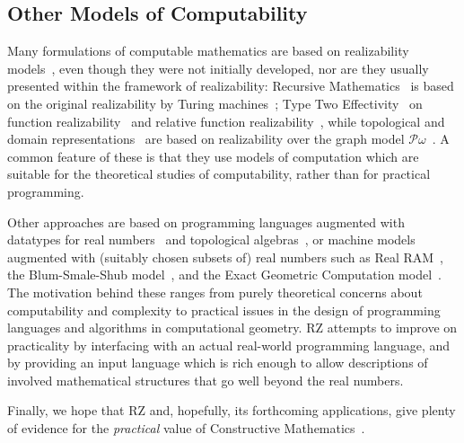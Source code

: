 \subsection{Other Models of Computability}
\label{sec:models-of-computability}

Many formulations of computable mathematics are based on realizability
models~\cite{Bauer:00}, even though they were not initially developed,
nor are they usually presented within the framework of realizability:
Recursive Mathematics~\cite{ershov98:_handb_recur_mathem} is based on
the original realizability by Turing machines~\cite{KleeneSC:intint};
Type Two Effectivity~\cite{Wei00} on function
realizability~\cite{KleeneSC:fouim} and relative function
realizability~\cite{BirkedalL:devttc}, while topological and domain
representations~\cite{Bla97a,Bauer:Birkedal:Scott:98} are based on
realizability over the graph model
$\mathcal{P}\omega$~\cite{ScottD:dattl}. A common feature of these is
that they use models of computation which are suitable for the
theoretical studies of computability, rather than for practical
programming. 

Other approaches are based on programming languages augmented with
datatypes for real numbers~\cite{Escardo:97,marcial-romero04:_seman}
and topological algebras~\cite{TZ98}, or machine models augmented with
(suitably chosen subsets of) real numbers such as Real
RAM~\cite{borodin75}, the Blum-Smale-Shub
model~\cite{blum98:_compl_real_comput}, and the Exact Geometric
Computation model~\cite{yap06:_theor_real_comput_egc}. The motivation
behind these ranges from purely theoretical concerns about
computability and complexity to practical issues in the design of
programming languages and algorithms in computational geometry. RZ
attempts to improve on practicality by interfacing with an actual
real-world programming language, and by providing an input language
which is rich enough to allow descriptions of involved mathematical
structures that go well beyond the real numbers.

Finally, we hope that RZ and, hopefully, its forthcoming applications,
give plenty of evidence for the \emph{practical} value of Constructive
Mathematics~\cite{Bishop:Bridges:85}.



